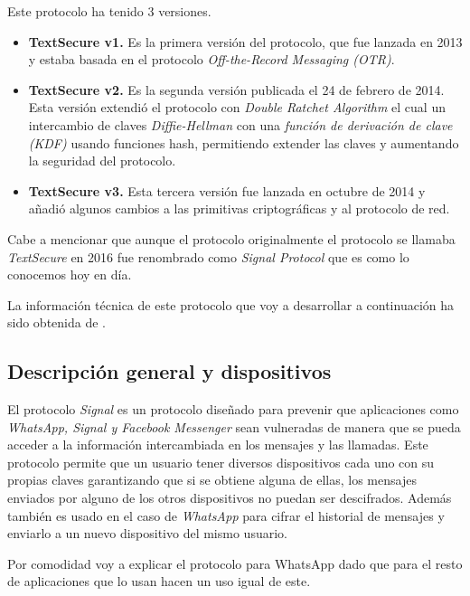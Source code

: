 Este protocolo ha tenido 3 versiones.
\begin{itemize}
	\item \textbf{TextSecure v1.} Es la primera versión del protocolo, que fue lanzada en 2013 y estaba basada en el protocolo \emph{Off-the-Record Messaging (OTR)}.
	\item \textbf{TextSecure v2.} Es la segunda versión publicada el 24 de febrero de 2014. Esta versión extendió el protocolo con \emph{Double Ratchet Algorithm} el cual un intercambio de claves \emph{Diffie-Hellman} con una \emph{función de derivación de clave (KDF)} usando funciones hash, permitiendo extender las claves y aumentando la seguridad del protocolo.
	\item \textbf{TextSecure v3.} Esta tercera versión fue lanzada en octubre de 2014 y añadió algunos cambios a las primitivas criptográficas y al protocolo de red.
\end{itemize}
Cabe a mencionar que aunque el protocolo originalmente el protocolo se llamaba \emph{TextSecure} en 2016 fue renombrado como \emph{Signal Protocol} que es como lo conocemos hoy en día.

La información técnica de este protocolo que voy a desarrollar a continuación ha sido obtenida de \cite{November2021b}.

\subsection{Descripción general y dispositivos}
El protocolo \emph{Signal} es un protocolo diseñado para prevenir que aplicaciones como \emph{WhatsApp, Signal y Facebook Messenger} sean vulneradas de manera que se pueda acceder a la información intercambiada en los mensajes y las llamadas. Este protocolo permite que un usuario tener diversos dispositivos cada uno con su propias claves garantizando que si se obtiene alguna de ellas, los mensajes enviados por alguno de los otros dispositivos no puedan ser descifrados. Además también es usado en el caso de \emph{WhatsApp} para cifrar el historial de mensajes y enviarlo a un nuevo dispositivo del mismo usuario.

Por comodidad voy a explicar el protocolo para WhatsApp dado que para el resto de aplicaciones que lo usan hacen un uso igual de este.

